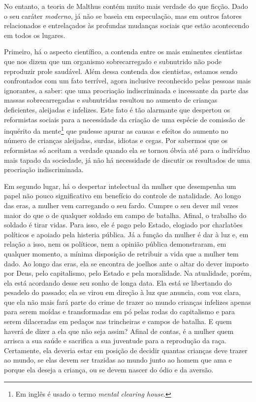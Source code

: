 No entanto, a teoria de Malthus contém muito mais verdade do que ficção.
Dado o seu caráter \textit{moderno}, já não se baseia em especulação, mas em
outros fatores relacionados e entrelaçados às profundas
mudanças sociais que estão acontecendo em todos os lugares.

Primeiro, há o aspecto científico, a contenda entre os mais eminentes
cientistas que nos dizem que um organismo sobrecarregado e subnutrido
não pode reproduzir prole saudável. Além dessa contenda dos cientistas,
estamos sendo confrontados com um fato terrível, agora inclusive
reconhecido pelas pessoas mais ignorantes, a saber: que uma procriação
indiscriminada e incessante da parte das massas sobrecarregadas e
subnutridas resultou no aumento de crianças deficientes, aleijadas e
infelizes. Este fato é tão alarmante que despertou os reformistas
sociais para a necessidade da criação de uma espécie de comissão de inquérito da mente\footnote{Em inglês é usado o termo \textit{mental clearing house}.} que pudesse apurar as causas e efeitos do aumento
no número de crianças aleijadas, surdas, idiotas e cegas. Por sabermos
que os reformistas só aceitam a verdade quando ela se tornou óbvia até
para o indivíduo mais tapado da sociedade, já não há necessidade de
discutir os resultados de uma procriação indiscriminada.

Em segundo lugar, há o despertar intelectual da mulher que desempenha um
papel não pouco significativo em benefício do controle de natalidade. Ao
longo das eras, a mulher vem carregando o seu fardo. Cumpre o seu dever
mil vezes maior do que o de qualquer soldado em campo de batalha.
Afinal, o trabalho do soldado é tirar vidas. Para isso, ele é pago pelo
Estado, elogiado por charlatões políticos e apoiado pela histeria
pública. Já a função da mulher é dar à luz e, em relação a isso, nem os
políticos, nem a opinião pública demonstraram, em qualquer momento, a
mínima disposição de retribuir a vida que a mulher tem dado. Ao longo
das eras, ela se encontra de joelhos ante o altar do dever imposto por
Deus, pelo capitalismo, pelo Estado e pela moralidade. Na atualidade,
porém, ela está acordando desse seu sonho de longa data. Ela está se
libertando do pesadelo do passado; ela se virou em direção à luz que
anuncia, com voz clara, que ela não mais fará parte do crime de trazer
ao mundo crianças infelizes apenas para serem moídas e transformadas em
pó pelas rodas do capitalismo e para serem dilaceradas em pedaços nas
trincheiras e campos de batalha. E quem haverá de dizer a ela que não
seja assim? Afinal de contas, é a mulher quem arrisca a sua saúde e
sacrifica a sua juventude para a reprodução da raça. Certamente, ela
deveria estar em posição de decidir quantas crianças deve trazer ao
mundo, se elas devem ser trazidas ao mundo junto ao homem que ama e
porque ela deseja a criança, ou se devem nascer do ódio e da aversão.

